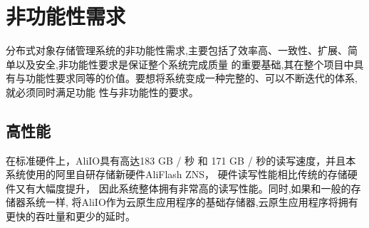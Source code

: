 \begin{center}
    \renewcommand\arraystretch{1.5}{
    }
\end{center}

\section{非功能性需求}
分布式对象存储管理系统的非功能性需求,主要包括了效率高、一致性、扩展、简单以及安全,非功能性要求是保证整个系统完成质量
的重要基础,其在整个项目中具有与功能性要求同等的价值。要想将系统变成一种完整的、可以不断迭代的体系,就必须同时满足功能
性与非功能性的要求。

\subsection{高性能}
在标准硬件上，AliIO具有高达183 GB / 秒 和 171 GB / 秒的读写速度，并且本系统使用的阿里自研存储新硬件AliFlash ZNS，
硬件读写性能相比传统的存储硬件又有大幅度提升，
因此系统整体拥有非常高的读写性能。同时,如果和一般的存储器系统一样,
将AliIO作为云原生应用程序的基础存储器,云原生应用程序将拥有更快的吞吐量和更少的延时。

